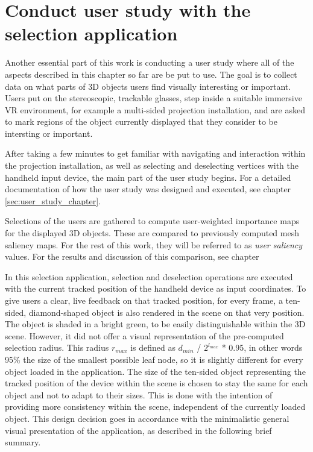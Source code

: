 	\section {Conduct user study with the selection application}
	\label{sec:conduct_user_study_with_the_selection_application}
Another essential part of this work is conducting a user study where all of the aspects described in this chapter so far are be put to use. The goal is to collect data on what parts of 3D objects users find visually interesting or important. Users put on the stereoscopic, trackable glasses, step inside a suitable immersive VR environment, for example a multi-sided projection installation, and are asked to mark regions of the object currently displayed that they consider to be intersting or important.

After taking a few minutes to get familiar with navigating and interaction within the projection installation, as well as selecting and deselecting vertices with the handheld input device, the main part of the user study begins. For a detailed documentation of how the user study was designed and executed, see chapter \ref{sec:user_study_chapter}.

Selections of the users are gathered to compute user-weighted importance maps for the displayed 3D objects. These are compared to previously computed mesh saliency maps. For the rest of this work, they will be referred to as \textit{user saliency} values. For the results and discussion of this comparison, see chapter 

In this selection application, selection and deselection operations are executed with the current tracked position of the handheld device as input coordinates. To give users a clear, live feedback on that tracked position, for every frame, a ten-sided, diamond-shaped object is also rendered in the scene on that very position. The object is shaded in a bright green, to be easily distinguishable within the 3D scene. However, it did not offer a visual representation of the pre-computed selection radius. This radius $r_{max}$ is defined as $d_{min}$ / $2^{l_{max}}$ * 0.95, in other words 95\% the size of the smallest possible leaf node, so it is slightly different for every object loaded in the application. The size of the ten-sided object representing the tracked position of the device within the scene is chosen to stay the same for each object and not to adapt to their sizes. This is done with the intention of providing more consistency within the scene, independent of the currently loaded object. This design decision goes in accordance with the minimalistic general visual presentation of the application, as described in the following brief summary.


